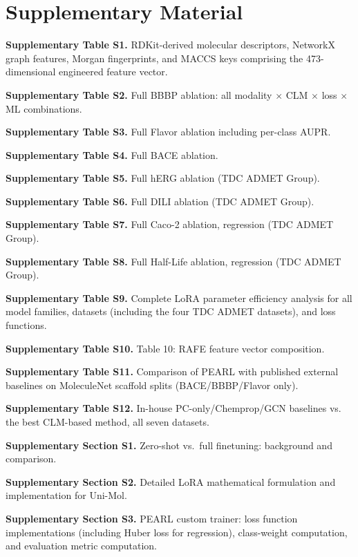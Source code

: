 \documentclass[pdflatex,sn-mathphys-num]{sn-jnl}%
\begin{document}
\section*{Supplementary Material}\label{sec:supplementary}

\noindent\textbf{Supplementary Table S1.} RDKit-derived molecular descriptors, NetworkX graph features, Morgan fingerprints, and MACCS keys comprising the 473-dimensional engineered feature vector.

\noindent\textbf{Supplementary Table S2.} Full BBBP ablation: all modality $\times$ CLM $\times$ loss $\times$ ML combinations.

\noindent\textbf{Supplementary Table S3.} Full Flavor ablation including per-class AUPR.

\noindent\textbf{Supplementary Table S4.} Full BACE ablation.

\noindent\textbf{Supplementary Table S5.} Full hERG ablation (TDC ADMET Group).

\noindent\textbf{Supplementary Table S6.} Full DILI ablation (TDC ADMET Group).

\noindent\textbf{Supplementary Table S7.} Full Caco-2 ablation, regression (TDC ADMET Group).

\noindent\textbf{Supplementary Table S8.} Full Half-Life ablation, regression (TDC ADMET Group).

\noindent\textbf{Supplementary Table S9.} Complete LoRA parameter efficiency analysis for all model families, datasets (including the four TDC ADMET datasets), and loss functions.

\noindent \textbf{Supplementary Table S10.} Table 10: RAFE feature vector composition.

\noindent \textbf{Supplementary Table S11.} Comparison of PEARL with published external baselines on MoleculeNet scaffold splits (BACE/BBBP/Flavor only).

\noindent \textbf{Supplementary Table S12.} In-house PC-only/Chemprop/GCN baselines vs. the best CLM-based method, all seven datasets.

\noindent\textbf{Supplementary Section S1.} Zero-shot vs.\ full finetuning: background and comparison.

\noindent\textbf{Supplementary Section S2.} Detailed LoRA mathematical formulation and implementation for Uni-Mol.

\noindent\textbf{Supplementary Section S3.} PEARL custom trainer: loss function implementations (including Huber loss for regression), class-weight computation, and evaluation metric computation.
\end{document}
